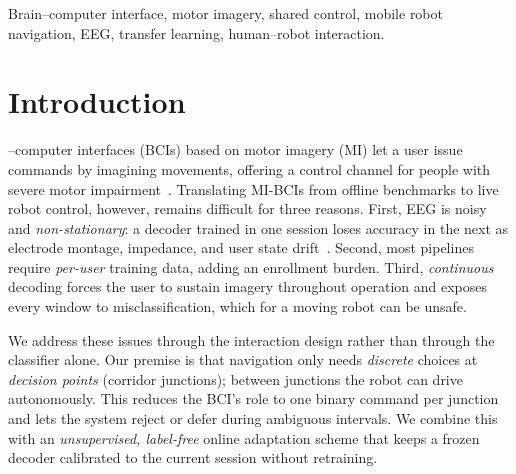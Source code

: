 \documentclass[10pt,journal]{IEEEtran}
\begin{document}
\begin{IEEEkeywords}
Brain--computer interface, motor imagery, shared control, mobile robot navigation, EEG,
transfer learning, human--robot interaction.
\end{IEEEkeywords}

\section{Introduction}
--computer interfaces (BCIs) based on motor imagery (MI) let a user
issue commands by imagining movements, offering a control channel for people with severe motor
impairment~\cite{leeb2015telepresence,tonin2021review}. Translating MI-BCIs from offline
benchmarks to live robot control, however, remains difficult for three reasons. First, EEG is
noisy and \emph{non-stationary}: a decoder trained in one session loses accuracy in the next as
electrode montage, impedance, and user state drift~\cite{ownDualValidation2025,wu2022transferreview}.
Second, most pipelines require \emph{per-user} training data, adding an enrollment burden.
Third, \emph{continuous} decoding forces the user to sustain imagery throughout operation and
exposes every window to misclassification, which for a moving robot can be unsafe.

We address these issues through the interaction design rather than through the classifier alone.
Our premise is that navigation only needs \emph{discrete} choices at \emph{decision points}
(corridor junctions); between junctions the robot can drive autonomously. This reduces the BCI's
role to one binary command per junction and lets the system reject or defer during ambiguous
intervals. We combine this with an \emph{unsupervised, label-free} online adaptation scheme that
keeps a frozen decoder calibrated to the current session without retraining.
\end{document}
